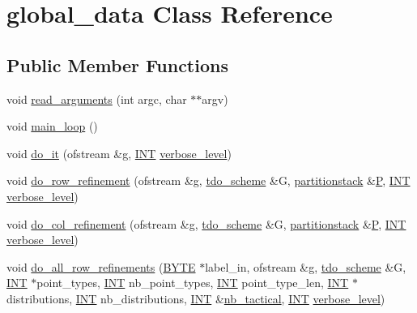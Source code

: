 \hypertarget{classglobal__data}{}\section{global\+\_\+data Class Reference}
\label{classglobal__data}
\subsection*{Public Member Functions}
\begin{DoxyCompactItemize}
\item 
void \mbox{\hyperlink{classglobal__data_a70f4890d19c2d48c7c1f4c4f29ff1a63}{read\+\_\+arguments}} (int argc, char $\ast$$\ast$argv)
\item 
void \mbox{\hyperlink{classglobal__data_abc6a1a7965a5dc2f8819f78aca590e84}{main\+\_\+loop}} ()
\item 
void \mbox{\hyperlink{classglobal__data_aa78a1e32894e05dd89133596873bdfbc}{do\+\_\+it}} (ofstream \&g, \mbox{\hyperlink{galois_8h_a09fddde158a3a20bd2dcadb609de11dc}{I\+NT}} \mbox{\hyperlink{classglobal__data_aed30c4b3aca4044f8f6c77a1b8eec208}{verbose\+\_\+level}})
\item 
void \mbox{\hyperlink{classglobal__data_aacbe3a029d0989a8c379b5679fec3f27}{do\+\_\+row\+\_\+refinement}} (ofstream \&g, \mbox{\hyperlink{classtdo__scheme}{tdo\+\_\+scheme}} \&G, \mbox{\hyperlink{classpartitionstack}{partitionstack}} \&\mbox{\hyperlink{simeon_8_c_a7fa15551e800919e93401fbbcd8e71e8}{P}}, \mbox{\hyperlink{galois_8h_a09fddde158a3a20bd2dcadb609de11dc}{I\+NT}} \mbox{\hyperlink{classglobal__data_aed30c4b3aca4044f8f6c77a1b8eec208}{verbose\+\_\+level}})
\item 
void \mbox{\hyperlink{classglobal__data_a4709794d5bd963b69a2fbdb0f4f69f95}{do\+\_\+col\+\_\+refinement}} (ofstream \&g, \mbox{\hyperlink{classtdo__scheme}{tdo\+\_\+scheme}} \&G, \mbox{\hyperlink{classpartitionstack}{partitionstack}} \&\mbox{\hyperlink{simeon_8_c_a7fa15551e800919e93401fbbcd8e71e8}{P}}, \mbox{\hyperlink{galois_8h_a09fddde158a3a20bd2dcadb609de11dc}{I\+NT}} \mbox{\hyperlink{classglobal__data_aed30c4b3aca4044f8f6c77a1b8eec208}{verbose\+\_\+level}})
\item 
void \mbox{\hyperlink{classglobal__data_ad9fc379d1c496c7ceea899c2132a62c1}{do\+\_\+all\+\_\+row\+\_\+refinements}} (\mbox{\hyperlink{galois_8h_ab6cc7b4aeb6ea31aba2b3fbfc83ff5e6}{B\+Y\+TE}} $\ast$label\+\_\+in, ofstream \&g, \mbox{\hyperlink{classtdo__scheme}{tdo\+\_\+scheme}} \&G, \mbox{\hyperlink{galois_8h_a09fddde158a3a20bd2dcadb609de11dc}{I\+NT}} $\ast$point\+\_\+types, \mbox{\hyperlink{galois_8h_a09fddde158a3a20bd2dcadb609de11dc}{I\+NT}} nb\+\_\+point\+\_\+types, \mbox{\hyperlink{galois_8h_a09fddde158a3a20bd2dcadb609de11dc}{I\+NT}} point\+\_\+type\+\_\+len, \mbox{\hyperlink{galois_8h_a09fddde158a3a20bd2dcadb609de11dc}{I\+NT}} $\ast$distributions, \mbox{\hyperlink{galois_8h_a09fddde158a3a20bd2dcadb609de11dc}{I\+NT}} nb\+\_\+distributions, \mbox{\hyperlink{galois_8h_a09fddde158a3a20bd2dcadb609de11dc}{I\+NT}} \&\mbox{\hyperlink{classglobal__data_aced72fd44b52dac38fa2ab350f713fa0}{nb\+\_\+tactical}}, \mbox{\hyperlink{galois_8h_a09fddde158a3a20bd2dcadb609de11dc}{I\+NT}} \mbox{\hyperlink{classglobal__data_aed30c4b3aca4044f8f6c77a1b8eec208}{verbose\+\_\+level}})
$$
\end{DoxyCompactItemize}
